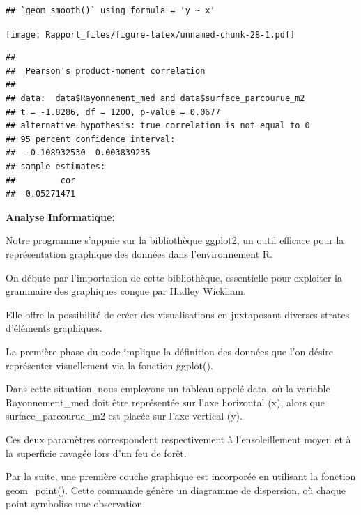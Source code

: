 \documentclass[
]{article}
\newenvironment{Shaded}{\begin{snugshade}}{\end{snugshade}}
\newcommand{\FunctionTok}[1]{\textcolor[rgb]{0.13,0.29,0.53}{\textbf{#1}}}
\newcommand{\NormalTok}[1]{#1}
\newcommand{\SpecialCharTok}[1]{\textcolor[rgb]{0.81,0.36,0.00}{\textbf{#1}}}
\begin{document}
\begin{verbatim}
## `geom_smooth()` using formula = 'y ~ x'
\end{verbatim}

\texttt{[image: Rapport\_files/figure-latex/unnamed-chunk-28-1.pdf]}

\begin{Shaded}
\end{Shaded}

\begin{verbatim}
## 
##  Pearson's product-moment correlation
## 
## data:  data$Rayonnement_med and data$surface_parcourue_m2
## t = -1.8286, df = 1200, p-value = 0.0677
## alternative hypothesis: true correlation is not equal to 0
## 95 percent confidence interval:
##  -0.108932530  0.003839235
## sample estimates:
##         cor 
## -0.05271471
\end{verbatim}

\textbf{Analyse Informatique:}

Notre programme s'appuie sur la bibliothèque ggplot2, un outil efficace
pour la représentation graphique des données dans l'environnement R.

On débute par l'importation de cette bibliothèque, essentielle pour
exploiter la grammaire des graphiques conçue par Hadley Wickham.

Elle offre la possibilité de créer des visualisations en juxtaposant
diverses strates d'éléments graphiques.

La première phase du code implique la définition des données que l'on
désire représenter visuellement via la fonction ggplot().

Dans cette situation, nous employons un tableau appelé data, où la
variable Rayonnement\_med doit être représentée sur l'axe horizontal
(x), alors que surface\_parcourue\_m2 est placée sur l'axe vertical (y).

Ces deux paramètres correspondent respectivement à l'ensoleillement
moyen et à la superficie ravagée lors d'un feu de forêt.

Par la suite, une première couche graphique est incorporée en utilisant
la fonction geom\_point(). Cette commande génère un diagramme de
dispersion, où chaque point symbolise une observation.
\end{document}
